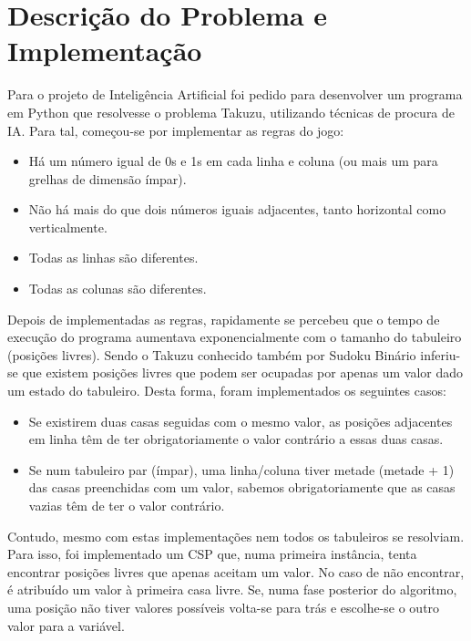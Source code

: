 \documentclass[12pt,a4paper]{article}
\begin{document}
  \section{Descrição do Problema e Implementação}

  Para o projeto de Inteligência Artificial foi pedido para desenvolver um programa em Python que resolvesse o problema Takuzu, utilizando técnicas de procura de IA.
  Para tal, começou-se por implementar as regras do jogo:

  \begin{itemize}
    \setlength{\itemsep}{0pt}
    \item Há um número igual de 0s e 1s em cada linha e coluna (ou mais um para grelhas de
    dimensão ímpar).
    \item Não há mais do que dois números iguais adjacentes, tanto horizontal como verticalmente.
    \item Todas as linhas são diferentes.
    \item Todas as colunas são diferentes.
  \end{itemize}

  Depois de implementadas as regras, rapidamente se percebeu que o tempo de execução do programa aumentava exponencialmente com o tamanho do tabuleiro (posições livres).
  Sendo o Takuzu conhecido também por Sudoku Binário inferiu-se que existem posições livres que podem ser ocupadas por apenas um valor dado um estado do tabuleiro. 
  Desta forma, foram implementados os seguintes casos:
  \begin{itemize}
    \setlength{\itemsep}{0pt}
    \item Se existirem duas casas seguidas com o mesmo valor, as posições adjacentes em linha têm de ter obrigatoriamente o valor contrário a essas duas casas.
    \item Se num tabuleiro par (ímpar), uma linha/coluna tiver metade (metade + 1) das casas preenchidas com um valor, sabemos obrigatoriamente que as casas vazias têm de ter o valor contrário. 
  \end{itemize}

  Contudo, mesmo com estas implementações nem todos os tabuleiros se resolviam.
  Para isso, foi implementado um CSP que, numa primeira instância, tenta encontrar posições livres que apenas aceitam um valor.
  No caso de não encontrar, é atribuído um valor à primeira casa livre.
  Se, numa fase posterior do algoritmo, uma posição não tiver valores possíveis volta-se para trás e escolhe-se o outro valor para a variável.
\end{document}
